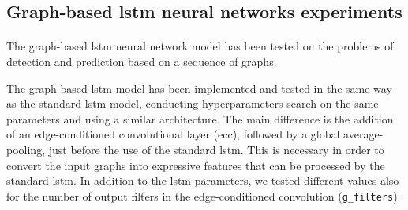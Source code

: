 \subsection{Graph-based \acs{lstm} neural networks experiments}
\paragraph{} The graph-based \acs{lstm} neural network model has been tested on the problems of detection and prediction based on a sequence of graphs.

The graph-based \acs{lstm} model has been implemented and tested in the same way as the standard \acs{lstm} model, conducting hyperparameters search on the same parameters and using a similar architecture. The main difference is the addition of an edge-conditioned convolutional layer (\acs{ecc}), followed by a global average-pooling, just before the use of the standard \acs{lstm}. This is necessary in order to convert the input graphs into expressive features that can be processed by the standard \acs{lstm}. In addition to the \acs{lstm} parameters, we tested different values also for the number of output filters in the edge-conditioned convolution (\texttt{g\_filters}).


